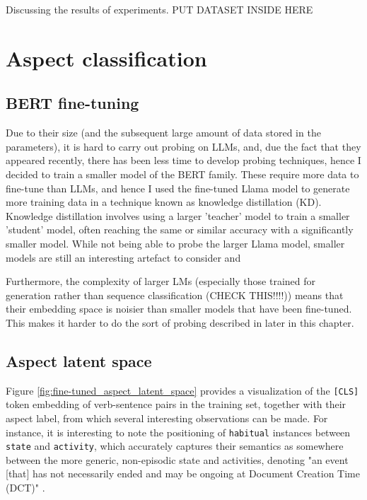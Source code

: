 Discussing the results of experiments. PUT DATASET INSIDE HERE

\section{Aspect classification}

\subsection{BERT fine-tuning}
Due to their size (and the subsequent large amount of data stored in the parameters), it is hard to carry out probing on LLMs, and, due the fact that they appeared recently, there has been less time to develop probing techniques, hence I decided to train a smaller model of the BERT \citep{devlin2019bert} family. These require more data to fine-tune than LLMs, and hence I used the fine-tuned Llama model to generate more training data in a technique known as knowledge distillation (KD). Knowledge distillation involves using a larger 'teacher' model to train a smaller 'student' model, often reaching the same or similar accuracy with a significantly smaller model. While not being able to probe the larger Llama model, smaller models are still an interesting artefact to consider and 

Furthermore, the complexity of larger LMs (especially those trained for generation rather than sequence classification (CHECK THIS!!!!)) means that their embedding space is noisier than smaller models that have been fine-tuned. This makes it harder to do the sort of probing described in later in this chapter.


\subsection{Aspect latent space}
Figure \ref{fig:fine-tuned_aspect_latent_space} provides a visualization of the \texttt{[CLS]} token embedding of verb-sentence pairs in the training set, together with their aspect label, from which several interesting observations can be made. For instance, it is interesting to note the positioning of \texttt{habitual} instances between \texttt{state} and \texttt{activity}, which accurately captures their semantics as somewhere between the more generic, non-episodic state and activities, denoting "an event [that] has not necessarily ended and may be ongoing at Document Creation Time (DCT)" \citep{umr}.

